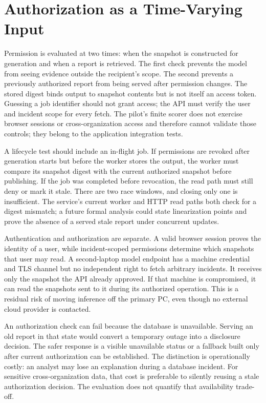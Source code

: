 \documentclass[conference,letterpaper]{IEEEtran}
\begin{document}
\section{Authorization as a Time-Varying Input}
Permission is evaluated at two times: when the snapshot is constructed for generation and when a report is retrieved. The first check prevents the model from seeing evidence outside the recipient's scope. The second prevents a previously authorized report from being served after permission changes. The stored digest binds output to snapshot contents but is not itself an access token. Guessing a job identifier should not grant access; the API must verify the user and incident scope for every fetch. The pilot's finite scorer does not exercise browser sessions or cross-organization access and therefore cannot validate those controls; they belong to the application integration tests.

A lifecycle test should include an in-flight job. If permissions are revoked after generation starts but before the worker stores the output, the worker must compare its snapshot digest with the current authorized snapshot before publishing. If the job was completed before revocation, the read path must still deny or mark it stale. There are two race windows, and closing only one is insufficient. The service's current worker and HTTP read paths both check for a digest mismatch; a future formal analysis could state linearization points and prove the absence of a served stale report under concurrent updates.

Authentication and authorization are separate. A valid browser session proves the identity of a user, while incident-scoped permissions determine which snapshots that user may read. A second-laptop model endpoint has a machine credential and TLS channel but no independent right to fetch arbitrary incidents. It receives only the snapshot the API already approved. If that machine is compromised, it can read the snapshots sent to it during its authorized operation. This is a residual risk of moving inference off the primary PC, even though no external cloud provider is contacted.

An authorization check can fail because the database is unavailable. Serving an old report in that state would convert a temporary outage into a disclosure decision. The safer response is a visible unavailable status or a fallback built only after current authorization can be established. The distinction is operationally costly: an analyst may lose an explanation during a database incident. For sensitive cross-organization data, that cost is preferable to silently reusing a stale authorization decision. The evaluation does not quantify that availability trade-off.
\end{document}
